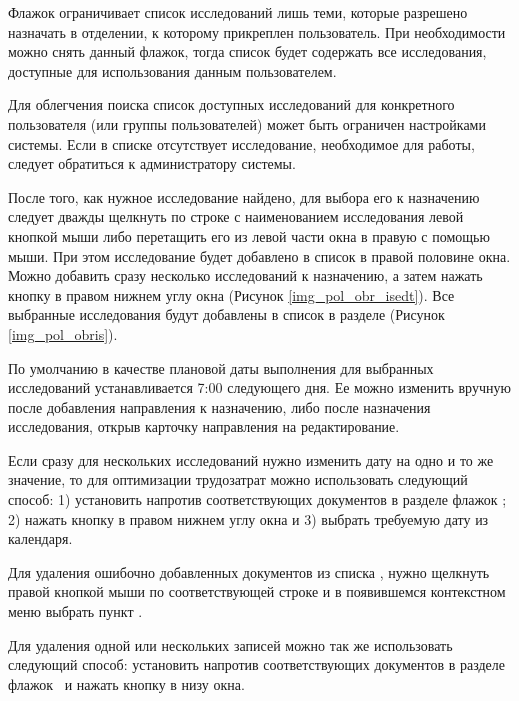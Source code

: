 Флажок  ограничивает список исследований лишь теми, которые разрешено назначать в отделении, к которому прикреплен пользователь. При необходимости можно снять данный флажок, тогда список будет содержать все исследования, доступные для использования данным пользователем.

\begin{prim}
 Для облегчения поиска список доступных исследований для конкретного пользователя (или группы пользователей) может быть ограничен настройками системы. Если в списке отсутствует исследование, необходимое для работы, следует обратиться к администратору системы.
\end{prim}
  
После того, как нужное исследование найдено, для выбора его к назначению следует дважды щелкнуть по строке с наименованием исследования левой кнопкой мыши либо перетащить его из левой части окна в правую с помощью мыши. При этом исследование будет добавлено в список  в правой половине окна. Можно добавить сразу несколько исследований к назначению, а затем нажать кнопку  в правом нижнем углу окна (Рисунок \ref{img_pol_obr_isedt}). Все выбранные исследования будут добавлены в список в разделе  (Рисунок \ref{img_pol_obris}).

По умолчанию в качестве плановой даты выполнения для выбранных исследований устанавливается 7:00 следующего дня. Ее можно изменить вручную после добавления направления к назначению, либо после назначения исследования, открыв карточку направления на редактирование.

\begin{prim}
 Если сразу для нескольких исследований нужно изменить дату на одно и то же значение, то для оптимизации трудозатрат можно использовать следующий способ: 1) установить напротив соответствующих документов в разделе  флажок \putx ; 2) нажать кнопку  в правом нижнем углу окна и 3) выбрать требуемую дату из календаря.
\end{prim}

Для удаления ошибочно добавленных документов из списка , нужно щелкнуть правой кнопкой мыши по соответствующей строке и в появившемся контекстном меню выбрать пункт .

\begin{prim}
 Для удаления одной или нескольких записей можно так же использовать следующий способ: установить напротив соответствующих документов в разделе  флажок \putx~и нажать кнопку  в низу окна.
\end{prim}

